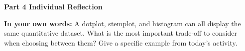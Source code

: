 \documentclass[10pt]{article}
\begin{document}
\vspace{0.12in}

{\large\bfseries\color{navy} Part 4 \quad Individual Reflection}

\vspace{0.08in}

\begin{tcolorbox}[colback=goldbg, colframe=goldacc, boxrule=0.8pt, arc=2mm,
    left=3mm, right=3mm, top=2mm, bottom=2mm]
\small\textbf{In your own words:} A dotplot, stemplot, and histogram can all display
the same quantitative dataset. What is the most important trade-off to consider
when choosing between them? Give a specific example from today's activity.\\[6pt]
\writeline\\[1pt]\writeline\\[1pt]\writeline
\end{tcolorbox}
\end{document}

